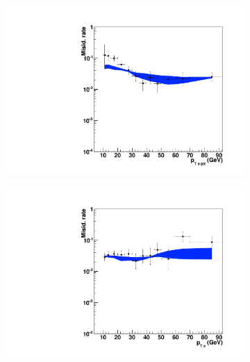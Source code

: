 \begin{figure}
        \begin{subfigure}[b]{0.33\textwidth}
		\includegraphics[width=\textwidth]{4_Analisys/pics/8TeV/plots/fakerates/e_emt_kNN_electronJetPt.pdf}
                \caption{}
        \end{subfigure}%
        \begin{subfigure}[b]{0.33\textwidth}
                \includegraphics[width=\textwidth]{4_Analisys/pics/8TeV/plots/fakerates/e_emt_kNN_electronPt.pdf}
                \caption{}
        \end{subfigure}
        \begin{subfigure}[b]{0.33\textwidth}

\end{subfigure}
\end{figure}

